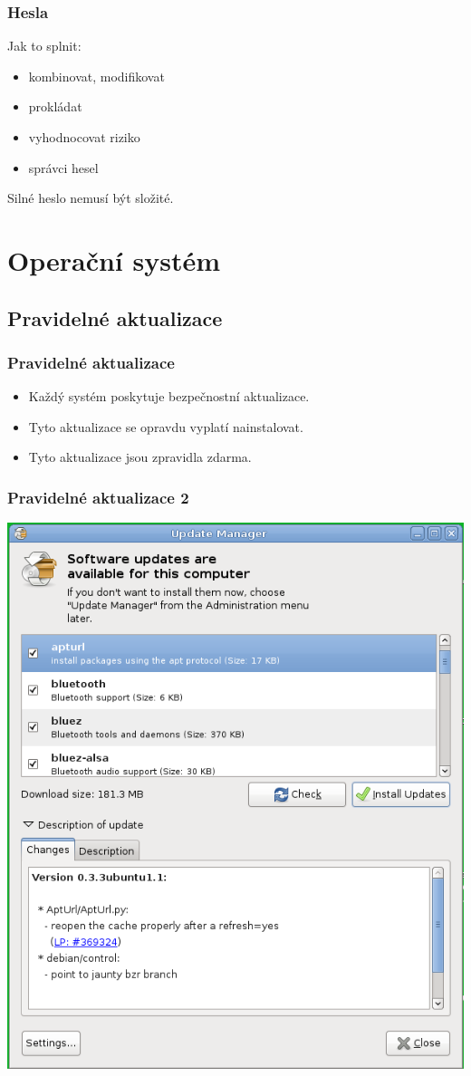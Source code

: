 \documentclass[xetex]{beamer}
\begin{document}
\begin{frame}
 \frametitle{Hesla}
 Jak to splnit:
 \begin{itemize} 
   \item kombinovat, modifikovat
   \item prokládat
   \item vyhodnocovat riziko
   \item správci hesel
 \end{itemize} 

Silné heslo nemusí být složité.
\end{frame}

\section{Operační systém}

\subsection{Pravidelné aktualizace}

\begin{frame}
	\frametitle{Pravidelné aktualizace} 
	\begin{itemize}
		\item Každý systém poskytuje bezpečnostní aktualizace.
		\item Tyto aktualizace se opravdu vyplatí nainstalovat.
		\item Tyto aktualizace jsou zpravidla zdarma.
	\end{itemize}
\end{frame}

\begin{frame}
	\frametitle{Pravidelné aktualizace 2} 
	\includegraphics[scale=0.3]{pic/gnome-update.png}
\end{frame}
\end{document}
